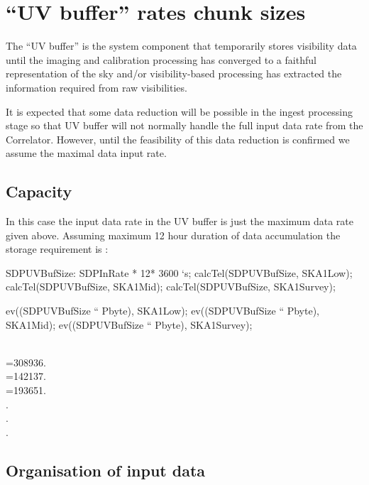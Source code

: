 \documentclass[useAMS,usenatbib,referee]{article}
\begin{document}
\section{``UV buffer'' rates chunk sizes}

The ``UV buffer'' is the system component that temporarily stores
visibility data until the imaging and calibration processing has
converged to a faithful representation of the sky and/or
visibility-based processing has extracted the information required
from raw visibilities. 

It is expected that some data reduction will be possible in the ingest
processing stage so that UV buffer will not normally handle the full
input data rate from the Correlator. However, until the feasibility of
this data reduction is confirmed we assume the maximal data input
rate. 

\subsection{Capacity}

In this case the input data rate in the UV buffer is just the maximum
data rate given above. Assuming maximum 12 hour duration of data
accumulation the storage requirement is :
\begin{maxima}[]
SDPUVBufSize: SDPInRate * 12* 3600 `s;
calcTel(SDPUVBufSize, SKA1Low);
calcTel(SDPUVBufSize, SKA1Mid);
calcTel(SDPUVBufSize, SKA1Survey);

ev((SDPUVBufSize `` Pbyte), SKA1Low);
ev((SDPUVBufSize `` Pbyte), SKA1Mid);
ev((SDPUVBufSize `` Pbyte), SKA1Survey);

\maximaoutput*
{}\;\, \\
\m  {}=308936.\; \\
\m  {}=142137.\; \\
\m  {}=193651.\; \\
.\; \\
.\; \\
.\; \\
\end{maxima}

\subsection{Organisation of input data}
\end{document}
